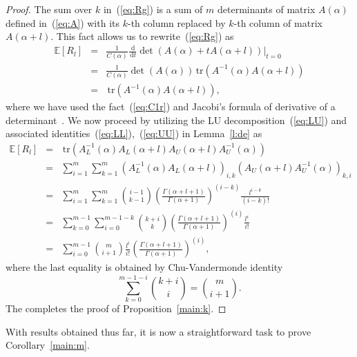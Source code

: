 \documentclass[pdflatex,sn-mathphys-num]{sn-jnl}%
\theoremstyle{thmstyleone}
\newcommand{\dd}{\,\mathrm{d}}
\newcommand{\tr}{\,\mathrm{tr}}
\begin{document}
\begin{proof}
The sum over $k$ in~(\ref{eq:Rg}) is a sum of $m$ determinants of matrix $A(\alpha)$ defined in~(\ref{eq:A}) with its $k$-th column replaced by $k$-th column of matrix $A(\alpha+l)$. This fact allows us to rewrite~(\ref{eq:Rg}) as
\begin{eqnarray}
\mathbb{E}\left[R_{l}\right] &=& \frac{1}{C(\alpha)}\frac{\dd}{\dd t}\det\left(A(\alpha)+tA(\alpha+l)\right)\!\big|_{t=0} \\
&=& \frac{1}{C(\alpha)}\det\left(A(\alpha)\right)\tr\left(A^{-1}(\alpha)A(\alpha+l)\right) \\
&=& \tr\left(A^{-1}(\alpha)A(\alpha+l)\right),
\end{eqnarray}
where we have used the fact~(\ref{eq:C1r}) and Jacobi's formula of derivative of a determinant~\cite{Forrester}. We now proceed by utilizing the LU decomposition~(\ref{eq:LU}) and associated identities~(\ref{eq:LL}),~(\ref{eq:UU}) in Lemma~\ref{l:de} as
\begin{eqnarray}
\mathbb{E}\left[R_{l}\right] &=& \tr\left(A_{L}^{-1}(\alpha)A_{L}(\alpha+l)A_{U}(\alpha+l)A_{U}^{-1}(\alpha)\right) \\
&=& \sum_{i=1}^{m}\sum_{k=1}^{m}\left(A_{L}^{-1}(\alpha)A_{L}(\alpha+l)\right)_{i,k}\left(A_{U}(\alpha+l)A_{U}^{-1}(\alpha)\right)_{k,i} \\
&=& \sum_{i=1}^{m}\sum_{k=1}^{m}\binom{i-1}{k-1}\left(\frac{\Gamma(\alpha+l+1)}{\Gamma(\alpha+1)}\right)^{(i-k)}\frac{l^{i-k}}{(i-k)!} \\
&=& \sum_{k=0}^{m-1}\sum_{i=0}^{m-1-k}\binom{k+i}{k}\left(\frac{\Gamma(\alpha+l+1)}{\Gamma(\alpha+1)}\right)^{(i)}\frac{l^{i}}{i!} \\
&=& \sum_{i=0}^{m-1}\binom{m}{i+1}\frac{l^{i}}{i!}\left(\frac{\Gamma(\alpha+l+1)}{\Gamma(\alpha+1)}\right)^{(i)},
\end{eqnarray}
where the last equality is obtained by Chu-Vandermonde identity~\cite[Eq.(A10)]{Wei17}
\begin{equation}
\sum_{k=0}^{m-1-i}\binom{k+i}{i}=\binom{m}{i+1}.
\end{equation}
The completes the proof of Proposition~\ref{main:k}.
\end{proof}

With results obtained thus far, it is now a straightforward task to prove Corollary~\ref{main:m}.
\end{document}
